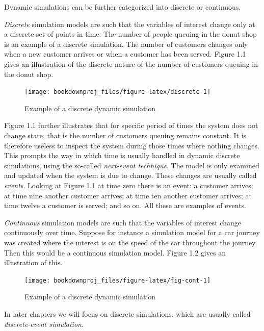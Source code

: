 \documentclass[
]{book}
\theoremstyle{definition}
\theoremstyle{definition}
\theoremstyle{definition}
\theoremstyle{definition}
\theoremstyle{remark}
\begin{document}
Dynamic simulations can be further categorized into discrete or continuous.

\emph{Discrete} simulation models are such that the variables of interest change only at a discrete set of points in time. The number of people queuing in the donut shop is an example of a discrete simulation. The number of customers changes only when a new customer arrives or when a customer has been served. Figure 1.1 gives an illustration of the discrete nature of the number of customers queuing in the donut shop.

\begin{figure}

{\centering \texttt{[image: bookdownproj\_files/figure-latex/discrete-1]} 

}

\caption{Example of a discrete dynamic simulation}\label{fig:discrete}
\end{figure}

Figure 1.1 further illustrates that for specific period of times the system does not change state, that is the number of customers queuing remains constant. It is therefore useless to inspect the system during those times where nothing changes. This prompts the way in which time is usually handled in dynamic discrete simulations, using the so-called \emph{next-event technique}. The model is only examined and updated when the system is due to change. These changes are usually called \emph{events}. Looking at Figure 1.1 at time zero there is an event: a customer arrives; at time nine another customer arrives; at time ten another customer arrives; at time twelve a customer is served; and so on. All these are examples of events.

\emph{Continuous} simulation models are such that the variables of interest change continuously over time. Suppose for instance a simulation model for a car journey was created where the interest is on the speed of the car throughout the journey. Then this would be a continuous simulation model. Figure 1.2 gives an illustration of this.

\begin{figure}

{\centering \texttt{[image: bookdownproj\_files/figure-latex/fig-cont-1]} 

}

\caption{Example of a discrete dynamic simulation}\label{fig:fig-cont}
\end{figure}

In later chapters we will focus on discrete simulations, which are usually called \emph{discrete-event simulation}.
\end{document}

